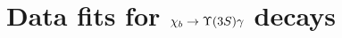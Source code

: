 \chapter{Data fits for \texorpdfstring{$\chib \to \Y3S \gamma$}{chib --> Y(3S) gamma} decays}
\label{sec:chib:ups3s:fits}


